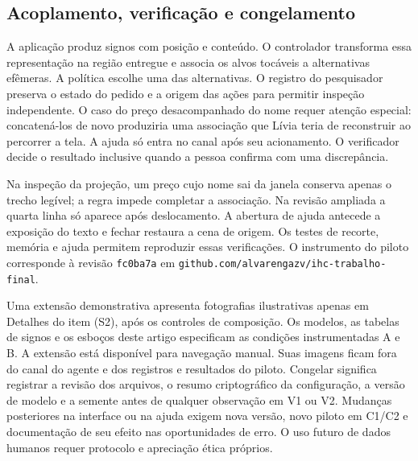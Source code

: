 \subsection{Acoplamento, verificação e congelamento}
A aplicação produz signos com posição e conteúdo. O controlador transforma essa representação na região entregue e associa os alvos tocáveis a alternativas efêmeras. A política escolhe uma das alternativas. O registro do pesquisador preserva o estado do pedido e a origem das ações para permitir inspeção independente. O caso do preço desacompanhado do nome requer atenção especial: concatená-los de novo produziria uma associação que Lívia teria de reconstruir ao percorrer a tela. A ajuda só entra no canal após seu acionamento. O verificador decide o resultado inclusive quando a pessoa confirma com uma discrepância.

\par Na inspeção da projeção, um preço cujo nome sai da janela conserva apenas o trecho legível; a regra impede completar a associação. Na revisão ampliada a quarta linha só aparece após deslocamento. A abertura de ajuda antecede a exposição do texto e fechar restaura a cena de origem. Os testes de recorte, memória e ajuda permitem reproduzir essas verificações. O instrumento do piloto corresponde à revisão \texttt{fc0ba7a} em \texttt{github.com/alvarengazv/ihc-trabalho-final}.
\par Uma extensão demonstrativa apresenta fotografias ilustrativas apenas em Detalhes do item (S2), após os controles de composição. Os modelos, as tabelas de signos e os esboços deste artigo especificam as condições instrumentadas A e B. A extensão está disponível para navegação manual. Suas imagens ficam fora do canal do agente e dos registros e resultados do piloto.
Congelar significa registrar a revisão dos arquivos, o resumo criptográfico da configuração, a versão de modelo e a semente antes de qualquer observação em V1 ou V2. Mudanças posteriores na interface ou na ajuda exigem nova versão, novo piloto em C1/C2 e documentação de seu efeito nas oportunidades de erro. O uso futuro de dados humanos requer protocolo e apreciação ética próprios.



